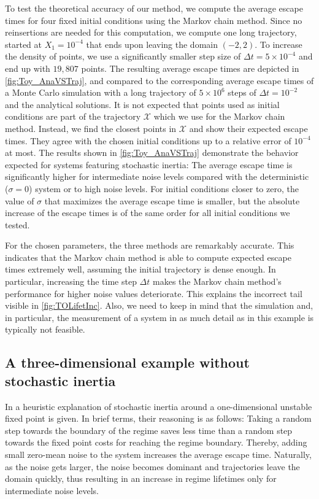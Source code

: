 To test the theoretical accuracy of our method, we compute the average escape times for four fixed initial conditions using the Markov chain method. Since no reinsertions are needed for this computation, we compute one long trajectory, started at $X_1 = 10^{-4}$ that ends upon leaving the domain $(-2, 2)$. To increase the density of points, we use a significantly smaller step size of $\Delta t = 5 \times 10^{-4}$ and end up with $19,807$ points. The resulting average escape times are depicted in \cref{fig:Toy_AnaVSTraj}, and compared to the corresponding average escape times of a Monte Carlo simulation with a long trajectory of $5 \times 10^6$ steps of $\Delta t = 10^{-2}$ and the analytical solutions. It is not expected that points used as initial conditions are part of the trajectory $\mathcal{X}$ which we use for the Markov chain method. Instead, we find the closest points in $\mathcal{X}$ and show their expected escape times. They agree with the chosen initial conditions up to a relative error of $10^{-4}$ at most. The results shown in \cref{fig:Toy_AnaVSTraj} demonstrate the behavior expected for systems featuring stochastic inertia: The average escape time is significantly higher for intermediate noise levels compared with the deterministic ($\sigma=0$) system or to high noise levels. For initial conditions closer to zero, the value of $\sigma$ that maximizes the average escape time is smaller, but the absolute increase of the escape times is of the same order for all initial conditions we tested.

For the chosen parameters, the three methods are remarkably accurate. This indicates that the Markov chain method is able to compute expected escape times extremely well, assuming the initial trajectory is dense enough. In particular, increasing the time step $\Delta t$ makes the Markov chain method's performance for higher noise values deteriorate. This explains the incorrect tail visible in \cref{fig:TOLifetInc}. Also, we need to keep in mind that the simulation and, in particular, the measurement of a system in as much detail as in this example is typically not feasible.

\subsection{A three-dimensional example without stochastic inertia}\label{sec:sI_3d}
In \textcite{dorringtonInteractionStochasticForcing2023} a heuristic explanation of stochastic inertia around a one-dimensional unstable fixed point is given. In brief terms, their reasoning is as follows: Taking a random step towards the boundary of the regime saves less time than a random step towards the fixed point costs for reaching the regime boundary. Thereby, adding small zero-mean noise to the system increases the average escape time. Naturally, as the noise gets larger, the noise becomes dominant and trajectories leave the domain quickly, thus resulting in an increase in regime lifetimes only for intermediate noise levels.

